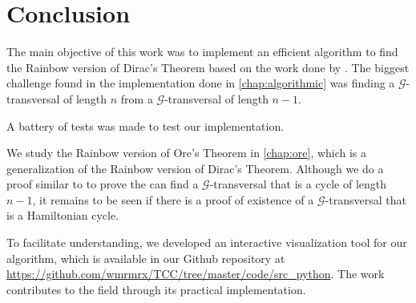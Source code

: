 
\chapter{Conclusion}

The main objective of this work was to implement an efficient algorithm to find
the Rainbow version of Dirac's Theorem based on the work done by \cite{Joos_2020}.
The biggest challenge found in the implementation done in \autoref{chap:algorithmic} was 
finding a $\mathcal{G}$-transversal of length $n$ from a $\mathcal{G}$-transversal of length $n - 1$.

A battery of tests was made to test our implementation.

We study the Rainbow version of Ore's Theorem in \autoref{chap:ore}, which is a generalization of
the Rainbow version of Dirac's Theorem. Although we do a proof similar
to \cite{Joos_2020} to prove the can find a 
$ \mathcal{G} $-transversal that is a cycle of length $ n - 1 $, it remains
to be seen if there is a proof of existence of a 
$ \mathcal{G} $-transversal that is a Hamiltonian cycle.

To facilitate understanding, we developed 
an interactive visualization tool for our algorithm, which is available in 
our Github repository at \url{https://github.com/wmrmrx/TCC/tree/master/code/src_python}.
The work contributes to the field through its practical implementation.